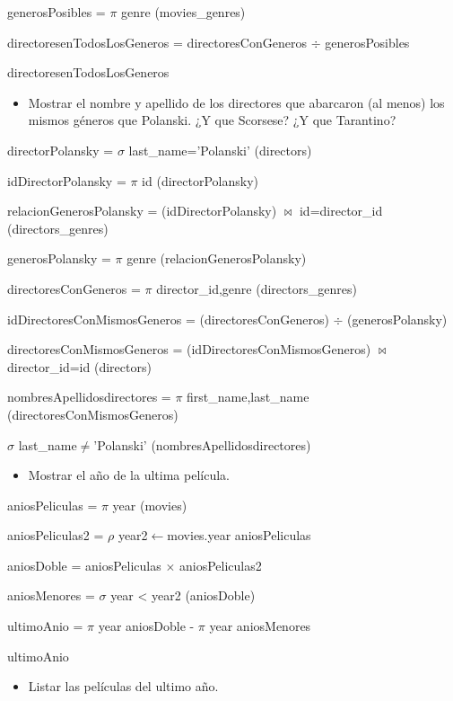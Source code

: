 generosPosibles = $\pi$ genre (movies\_genres)

directoresenTodosLosGeneros = directoresConGeneros $\div$ generosPosibles

directoresenTodosLosGeneros


\begin{itemize}
\item Mostrar el nombre y apellido de los directores que abarcaron (al menos) los mismos géneros que Polanski. ¿Y que Scorsese? ¿Y que Tarantino?
\end{itemize}


directorPolansky = $\sigma$ last\_name='Polanski' (directors)

idDirectorPolansky = $\pi$ id (directorPolansky)

relacionGenerosPolansky = (idDirectorPolansky) $\bowtie$ id=director\_id (directors\_genres)

generosPolansky = $\pi$ genre (relacionGenerosPolansky)

directoresConGeneros = $\pi$ director\_id,genre (directors\_genres)

idDirectoresConMismosGeneros = (directoresConGeneros) $\div$ (generosPolansky)

directoresConMismosGeneros = (idDirectoresConMismosGeneros) $\bowtie$ director\_id=id (directors)

nombresApellidosdirectores = $\pi$ first\_name,last\_name (directoresConMismosGeneros)

$\sigma$ last\_name$\ne$'Polanski' (nombresApellidosdirectores)


\begin{itemize}
\item Mostrar el año de la ultima película.
\end{itemize}

aniosPeliculas = $\pi$ year (movies)

aniosPeliculas2 = $\rho$ year2$\leftarrow$movies.year aniosPeliculas

aniosDoble = aniosPeliculas $\times$ aniosPeliculas2

aniosMenores = $\sigma$ year < year2 (aniosDoble)

ultimoAnio = $\pi$ year aniosDoble - $\pi$ year aniosMenores

ultimoAnio



\begin{itemize}
\item Listar las películas del ultimo año.
\end{itemize}

